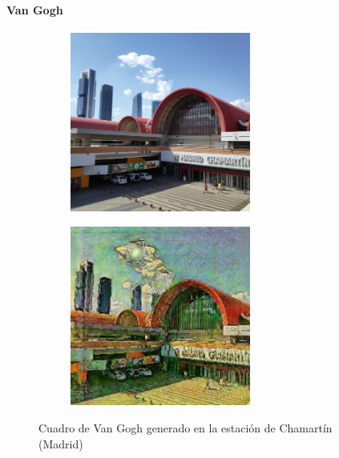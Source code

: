 \documentclass[[../main.tex]{subfiles}
\begin{document}
        \newpage
    
    \paragraph{Van Gogh}

    \begin{figure}[!htb]
            \begin{subfigure}[b]{0.49\textwidth}
            \includegraphics[width=0.65\textwidth]{imagenes/imagen2cuadro/propias/vangogh/IMG_20190724_172550_1.jpg}
            \end{subfigure}
        \hfill
            \begin{subfigure}[b]{0.49\textwidth}
            \includegraphics[width=0.65\textwidth]{imagenes/imagen2cuadro/propias/vangogh/IMG_20190724_172550_1_2.jpg}
            \end{subfigure}
        \caption{Cuadro de Van Gogh generado en la estación de Chamartín (Madrid)}
        \label{fig:vangogh_cuadro_chamartin}
        \end{figure}
        
\end{document}

